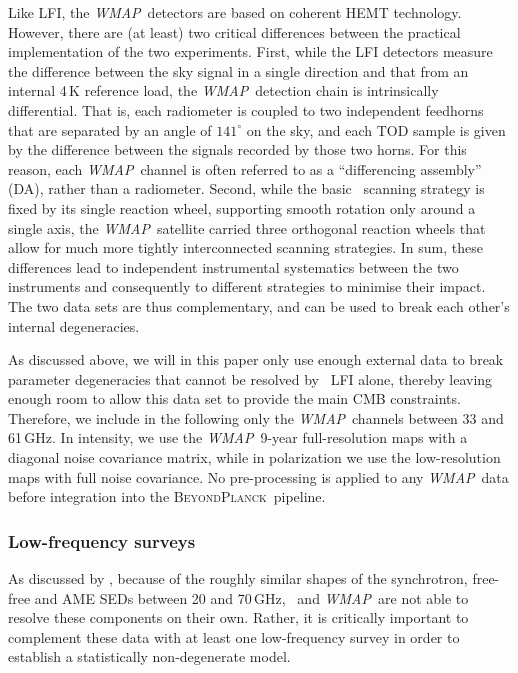 \documentclass[onecolumn]{aa}
\def\WMAP{\emph{WMAP}}
\newcommand{\BP}{\textsc{BeyondPlanck}}
\begin{document}
Like LFI, the \WMAP\ detectors are based on coherent HEMT
technology. However, there are (at least) two critical differences
between the practical implementation of the two experiments. First,
while the LFI detectors measure the difference between the sky signal
in a single direction and that from an internal 4\,K reference load,
the \WMAP\ detection chain is intrinsically differential. That is,
each radiometer is coupled to two independent feedhorns that are
separated by an angle of $141^{\circ}$ on the sky, and each TOD sample
is given by the difference between the signals recorded by those two
horns. For this reason, each \WMAP\ channel is often referred to as a
``differencing assembly'' (DA), rather than a radiometer. Second,
while the basic \Planck\ scanning strategy is fixed by its single
reaction wheel, supporting smooth rotation only around a single axis,
the \WMAP\ satellite carried three orthogonal reaction wheels that
allow for much more tightly interconnected scanning strategies. In
sum, these differences lead to independent instrumental systematics
between the two instruments and consequently to different strategies
to minimise their impact.  The two data sets are thus complementary,
and can be used to break each other's internal degeneracies.

As discussed above, we will in this paper only use enough external
data to break parameter degeneracies that cannot be resolved by
\Planck\ LFI alone, thereby leaving enough room to allow this data set
to provide the main CMB constraints. Therefore, we include in the
following only the \WMAP\ channels between 33 and 61\,GHz. In
intensity, we use the \WMAP\ 9-year full-resolution maps with a
diagonal noise covariance matrix, while in polarization we use the
low-resolution maps with full noise covariance. No pre-processing is
applied to any \WMAP\ data before integration into the \BP\ pipeline.

\subsubsection{Low-frequency surveys}

As discussed by \citet{planck2014-a12}, because of the roughly similar
shapes of the synchrotron, free-free and AME SEDs between 20 and
70\,GHz, \Planck\ and \WMAP\ are not able to resolve these components
on their own. Rather, it is critically important to complement these
data with at least one low-frequency survey in order to establish a
statistically non-degenerate model.
\end{document}

